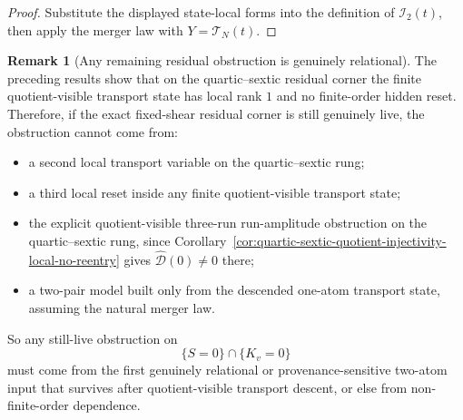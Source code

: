 \documentclass[11pt,a4paper]{amsart}
\theoremstyle{plain}
\theoremstyle{definition}
\newtheorem{remark}[theorem]{Remark}
\begin{document}
\begin{proof}
Substitute the displayed state-local forms into the definition of
$\mathcal I_2(t)$, then apply the merger law with $Y=\mathcal T_N(t)$.
\end{proof}

\begin{remark}[Any remaining residual obstruction is genuinely relational]
\label{rem:any-remaining-residual-obstruction-is-genuinely-relational}
The preceding results show that on the quartic--sextic residual corner the
finite quotient-visible transport state has local rank $1$ and no finite-order
hidden reset. Therefore, if the exact fixed-shear residual corner is still
genuinely live, the obstruction cannot come from:
\begin{itemize}
\item a second local transport variable on the quartic--sextic rung;
\item a third local reset inside any finite quotient-visible transport state;
\item the explicit quotient-visible three-run run-amplitude obstruction on the
quartic--sextic rung, since
Corollary~\ref{cor:quartic-sextic-quotient-injectivity-local-no-reentry}
gives $\widehat{\mathcal D}(0)\neq 0$ there;
\item a two-pair model built only from the descended one-atom transport state,
assuming the natural merger law.
\end{itemize}
So any still-live obstruction on
\[
\{S=0\}\cap\{K_v=0\}
\]
must come from the first genuinely relational or provenance-sensitive two-atom
input that survives after quotient-visible transport descent, or else from
non-finite-order dependence.
\end{remark}
\end{document}

